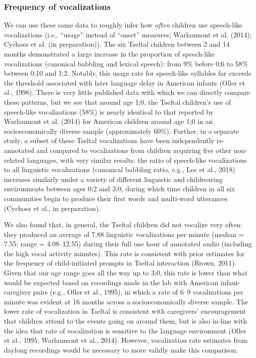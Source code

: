\documentclass[,man,floatsintext]{apa6}
\begin{document}
\subsubsection{Frequency of
vocalizations}\label{frequency-of-vocalizations}

We can use these same data to roughly infer how \emph{often} children
use speech-like vocalizations (i.e., \enquote{usage} instead of
\enquote{onset} measures; Warlaumont et al. (2014); Cychosz et al. (in
preparation)). The six Tseltal children between 2 and 14 months
demonstrated a large increase in the proportion of speech-like
vocalizations (canonical babbling and lexical speech): from 9\% before
0;6 to 58\% between 0;10 and 1;2. Notably, this usage rate for
speech-like syllables far exceeds the threshold associated with later
language delay in American infants (Oller et al., 1998). There is very
little published data with which we can directly compare these patterns,
but we see that around age 1;0, the Tseltal children's use of
speech-like vocalizations (58\%) is nearly identical to that reported by
Warlaumont et al. (2014) for American children around age 1;0 in an
socioeconomically diverse sample (approximately 60\%). Further, in a
separate study, a subset of these Tseltal vocalizations have been
independently re-annotated and compared to vocalizations from children
acquiring five other non-related languages, with very similar results:
the ratio of speech-like vocalizations to all linguistic vocalizations
(canonical babbling ratio, e.g., Lee et al., 2018) increases similarly
under a variety of different linguistic and childrearing environments
between ages 0;2 and 3;0, during which time children in all six
communities begin to produce their first words and multi-word utterances
(Cychosz et al., in preparation).

We also found that, in general, the Tseltal children did not vocalize
very often: they produced an average of 7.88 linguistic vocalizations
per minute (median = 7.55; range = 4.08--12.55) during their full one
hour of annotated audio (including the high vocal activity minutes).
This rate is consistent with prior estimates for the frequency of
child-initiated prompts in Tseltal interaction (Brown, 2011). Given that
our age range goes all the way up to 3;0, this rate is lower than what
would be expected based on recordings made in the lab with American
infant-caregiver pairs (e.g., Oller et al., 1995), in which a rate of
6--9 vocalizations per minute was evident at 16 months across a
socioeconomically diverse sample. The lower rate of vocalization in
Tseltal is consistent with caregivers' encouragement that children
attend to the events going on around them, but is also in-line with the
idea that rate of vocalization is sensitive to the language environment
(Oller et al., 1995; Warlaumont et al., 2014). However, vocalization
rate estimates from daylong recordings would be necessary to more
validly make this comparison.
\end{document}
